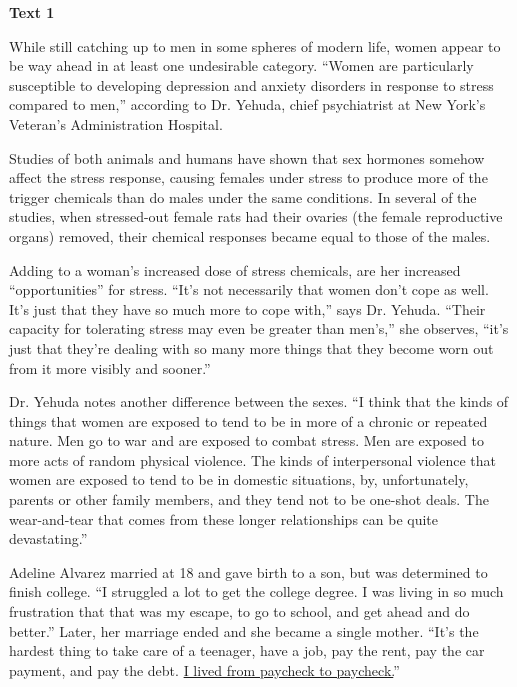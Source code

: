 
\begin{center}\textbf{Text 1}\end{center}

\qquad While still catching up to men in some spheres of modern life, women appear to be way ahead in at least one undesirable category. ``Women are particularly susceptible to developing depression and anxiety disorders in response to stress compared to men,'' according to Dr. Yehuda, chief psychiatrist at New York's Veteran's Administration Hospital.

\qquad Studies of both animals and humans have shown that sex hormones somehow affect the stress response, causing females under stress to produce more of the trigger chemicals than do males under the same conditions. In several of the studies, when stressed-out female rats had their ovaries (the female reproductive organs) removed, their chemical responses became equal to those of the males.

\qquad Adding to a woman's increased dose of stress chemicals, are her increased ``opportunities'' for stress. ``It's not necessarily that women don't cope as well. It's just that they have so much more to cope with,'' says Dr. Yehuda. ``Their capacity for tolerating stress may even be greater than men's,'' she observes, ``it's just that they're dealing with so many more things that they become worn out from it more visibly and sooner.''

\qquad Dr. Yehuda notes another difference between the sexes. ``I think that the kinds of things that women are exposed to tend to be in more of a chronic or repeated nature. Men go to war and are exposed to combat stress. Men are exposed to more acts of random physical violence. The kinds of interpersonal violence that women are exposed to tend to be in domestic situations, by, unfortunately, parents or other family members, and they tend not to be one-shot deals. The wear-and-tear that comes from these longer relationships can be quite devastating.''

\qquad Adeline Alvarez married at 18 and gave birth to a son, but was determined to finish college. ``I struggled a lot to get the college degree. I was living in so much frustration that that was my escape, to go to school, and get ahead and do better.'' Later, her marriage ended and she became a single mother. ``It's the hardest thing to take care of a teenager, have a job, pay the rent, pay the car payment, and pay the debt. \ul{I lived from paycheck to paycheck.}''

